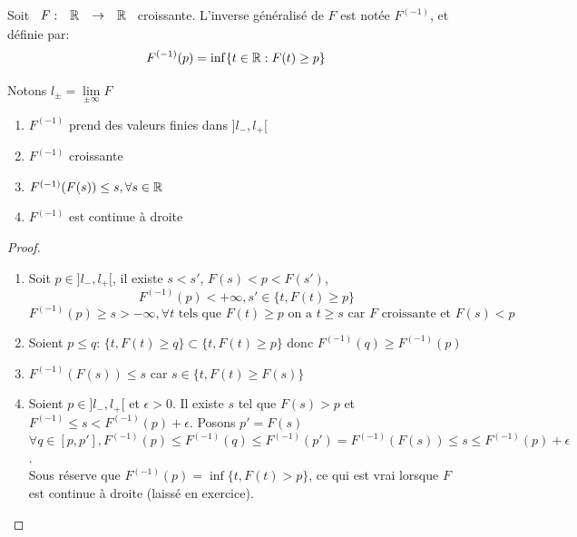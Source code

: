 \documentclass[]{report}
\begin{document}
    \begin{df}{}{}
        Soit $\begin{array}{ccccc} F : & \mathbb{R} & \to & \mathbb{R} \end{array}$ croissante. L'inverse généralisé de $F$ est notée $F^{(-1)}$, et définie par:
        \[F^{(-1)}(p)=\inf\{t\in \mathbb{R}:F(t)\ge p\}\]
    \end{df}

    \begin{prop}{}{}
        Notons $l_\pm=\underset{\pm\infty}{\lim} F$
        \begin{enumerate}
            \item $F^{(-1)}$ prend des valeurs finies dans $]l_-,l_+[$
            \item $F^{(-1)}$ croissante
            \item $F^{(-1)}(F(s))\le s,\forall s\in\mathbb{R}$
            \item $F^{(-1)}$ est continue à droite
        \end{enumerate}
    \end{prop}

    \begin{proof}
        \begin{enumerate}
            \item Soit $p\in]l_-,l_+[$, il existe $s<s'$, $F(s)<p<F(s')$,\\ 
            \[F^{(-1)}(p)<+\infty, s'\in \{t,F(t)\ge p\}\]
            \[F^{(-1)}(p)\ge s>-\infty,\forall t\text{ tels que }F(t)\ge p\text{ on a }t\ge s\text{ car }F\text{ croissante et }F(s)<p\]
            \item Soient $p\le q$: $\{t, F(t)\ge q\}\subset \{t,F(t)\ge p\}$ donc $F^{(-1)}(q)\ge F^{(-1)}(p)$
            \item $F^{(-1)}(F(s))\le s$ car $s\in \{t,F(t)\ge F(s)\}$
            \item Soient $p\in ]l_-,l_+[$ et $\epsilon>0$. Il existe $s$ tel que $F(s)>p$ et $F^{(-1)}\le s< F^{(-1)}(p)+\epsilon$. Posons $p'=F(s)$\\
            $\forall q\in [p,p'], F^{(-1)}(p)\le F^{(-1)}(q)\le F^{(-1)}(p')=F^{(-1)}(F(s))\le s\le F^{(-1)}(p)+\epsilon$.\\
            Sous réserve que $F^{(-1)}(p)=\inf\{t,F(t)>p\}$, ce qui est vrai lorsque $F$ est continue à droite (laissé en exercice).
        \end{enumerate}
    \end{proof}
\end{document}
